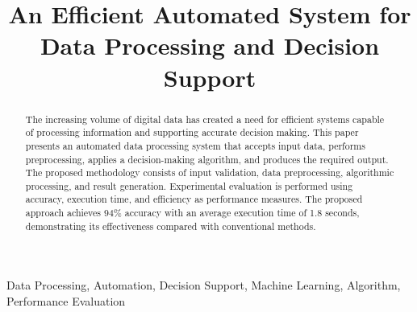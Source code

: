 \documentclass[conference]{IEEEtran}
\begin{document}

\title{
An Efficient Automated System for Data Processing and
Decision Support
}


\author{
}

\maketitle


\begin{abstract}

The increasing volume of digital data has created a need for
efficient systems capable of processing information and
supporting accurate decision making. This paper presents an
automated data processing system that accepts input data,
performs preprocessing, applies a decision-making algorithm,
and produces the required output. The proposed methodology
consists of input validation, data preprocessing, algorithmic
processing, and result generation. Experimental evaluation
is performed using accuracy, execution time, and efficiency
as performance measures. The proposed approach achieves
94\% accuracy with an average execution time of 1.8 seconds,
demonstrating its effectiveness compared with conventional
methods.

\end{abstract}


\begin{IEEEkeywords}

Data Processing, Automation, Decision Support,
Machine Learning, Algorithm, Performance Evaluation

\end{IEEEkeywords}
\end{document}
